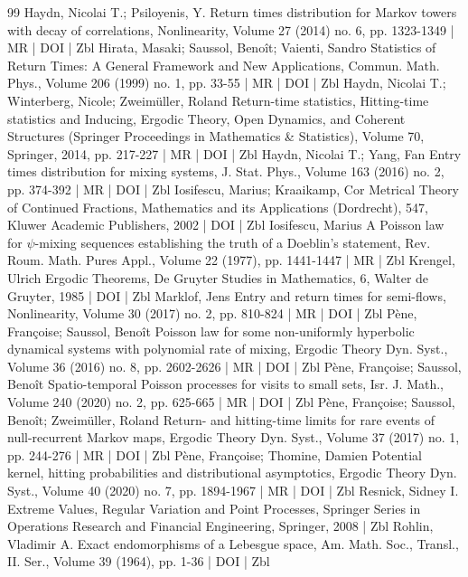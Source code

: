 \begin{thebibliography}{99}
Haydn, Nicolai T.; Psiloyenis, Y. Return times distribution for Markov towers with decay of correlations, Nonlinearity, Volume 27 (2014) no. 6, pp. 1323-1349 | MR | DOI | Zbl
Hirata, Masaki; Saussol, Benoît; Vaienti, Sandro Statistics of Return Times: A General Framework and New Applications, Commun. Math. Phys., Volume 206 (1999) no. 1, pp. 33-55 | MR | DOI | Zbl
Haydn, Nicolai T.; Winterberg, Nicole; Zweimüller, Roland Return-time statistics, Hitting-time statistics and Inducing, Ergodic Theory, Open Dynamics, and Coherent Structures (Springer Proceedings in Mathematics \& Statistics), Volume 70, Springer, 2014, pp. 217-227 | MR | DOI | Zbl
Haydn, Nicolai T.; Yang, Fan Entry times distribution for mixing systems, J. Stat. Phys., Volume 163 (2016) no. 2, pp. 374-392 | MR | DOI | Zbl
Iosifescu, Marius; Kraaikamp, Cor Metrical Theory of Continued Fractions, Mathematics and its Applications (Dordrecht), 547, Kluwer Academic Publishers, 2002 | DOI | Zbl
Iosifescu, Marius A Poisson law for $\psi $-mixing sequences establishing the truth of a Doeblin’s statement, Rev. Roum. Math. Pures Appl., Volume 22 (1977), pp. 1441-1447 | MR | Zbl
Krengel, Ulrich Ergodic Theorems, De Gruyter Studies in Mathematics, 6, Walter de Gruyter, 1985 | DOI | Zbl
Marklof, Jens Entry and return times for semi-flows, Nonlinearity, Volume 30 (2017) no. 2, pp. 810-824 | MR | DOI | Zbl
Pène, Françoise; Saussol, Benoît Poisson law for some non-uniformly hyperbolic dynamical systems with polynomial rate of mixing, Ergodic Theory Dyn. Syst., Volume 36 (2016) no. 8, pp. 2602-2626 | MR | DOI | Zbl
Pène, Françoise; Saussol, Benoît Spatio-temporal Poisson processes for visits to small sets, Isr. J. Math., Volume 240 (2020) no. 2, pp. 625-665 | MR | DOI | Zbl
Pène, Françoise; Saussol, Benoît; Zweimüller, Roland Return- and hitting-time limits for rare events of null-recurrent Markov maps, Ergodic Theory Dyn. Syst., Volume 37 (2017) no. 1, pp. 244-276 | MR | DOI | Zbl
Pène, Françoise; Thomine, Damien Potential kernel, hitting probabilities and distributional asymptotics, Ergodic Theory Dyn. Syst., Volume 40 (2020) no. 7, pp. 1894-1967 | MR | DOI | Zbl
Resnick, Sidney I. Extreme Values, Regular Variation and Point Processes, Springer Series in Operations Research and Financial Engineering, Springer, 2008 | Zbl
Rohlin, Vladimir A. Exact endomorphisms of a Lebesgue space, Am. Math. Soc., Transl., II. Ser., Volume 39 (1964), pp. 1-36 | DOI | Zbl

\end{thebibliography}
